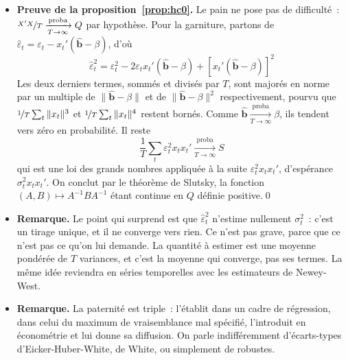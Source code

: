 \documentclass[10pt,a4paper]{article}
\newcommand{\plim}{\xrightarrow[T\rightarrow\infty]{\text{proba}}}
\theoremstyle{definition}
\renewcommand{\newline}{\unskip\par\vspace{1.5pt}}
\begin{document}
\begin{notes}

  \begin{itemize}

  \item \textbf{Preuve de la proposition~\ref{prop:hc0}.} Le pain ne pose pas de
    difficulté~: $\nicefrac{X'X}{T}\plim Q$ par hypothèse. Pour la garniture,
    partons de $\hat\varepsilon_t = \varepsilon_t - x_t'(\hat{\mathbf b}-\beta)$,
    d'où
    \[
      \hat\varepsilon_t^2 = \varepsilon_t^2
      - 2\varepsilon_t x_t'(\hat{\mathbf b}-\beta)
      + \left[x_t'(\hat{\mathbf b}-\beta)\right]^2
    \]
    Les deux derniers termes, sommés et divisés par $T$, sont majorés en norme
    par un multiple de $\|\hat{\mathbf b}-\beta\|$ et de
    $\|\hat{\mathbf b}-\beta\|^2$ respectivement, pourvu que
    $\nicefrac{1}{T}\sum_t\|x_t\|^3$ et $\nicefrac{1}{T}\sum_t\|x_t\|^4$ restent
    bornés. Comme $\hat{\mathbf b}\plim\beta$, ils tendent vers zéro en
    probabilité. Il reste
    \[
      \frac{1}{T}\sum_t \varepsilon_t^2x_tx_t' \plim S
    \]
    qui est une loi des grands nombres appliquée à la suite
    $\varepsilon_t^2x_tx_t'$, d'espérance $\sigma_t^2x_tx_t'$. On conclut par le
    théorème de Slutsky, la fonction $(A,B)\mapsto A^{-1}BA^{-1}$ étant continue
    en $Q$ définie positive.\qed\newline

  \item \textbf{Remarque.} Le point qui surprend est que
    $\hat\varepsilon_t^2$ n'estime nullement $\sigma_t^2$~: c'est un tirage
    unique, et il ne converge vers rien. Ce n'est pas grave, parce que ce n'est
    pas ce qu'on lui demande. La quantité à estimer est une moyenne pondérée de
    $T$ variances, et c'est la moyenne qui converge, pas ses termes. La même
    idée reviendra en séries temporelles avec les estimateurs de
    Newey-West.\newline

  \item \textbf{Remarque.} La paternité est triple~: \cite{Eicker1967} l'établit
    dans un cadre de régression, \cite{Huber1967} dans celui du maximum de
    vraisemblance mal spécifié, \cite{White1980} l'introduit en économétrie et
    lui donne sa diffusion. On parle indifféremment d'écarts-types d'Eicker-Huber-White,
    de White, ou simplement de robustes.

  \end{itemize}

\end{notes}
\end{document}
